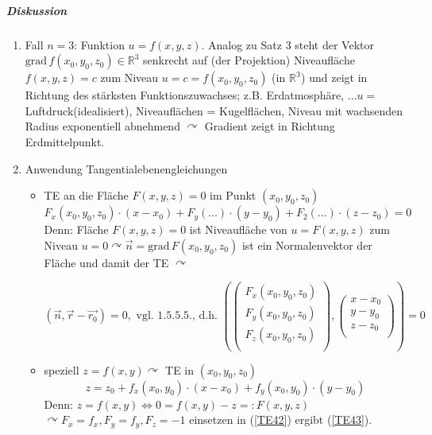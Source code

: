 \documentclass[a4paper]{scrartcl}
\begin{document}
\subparagraph{Diskussion}
\begin{enumerate}
\item Fall $n=3$: Funktion $u=f(x,y,z)$. Analog zu Satz 3 steht der Vektor $\text{grad} \, f (x_0,y_0,z_0) \in \mathbb{R}^3$ senkrecht auf (der Projektion) Niveaufläche $f(x,y,z) = c$ zum Niveau $u=c=f(x_0,y_0,z_0)$ (in $\mathbb{R^3}$) und zeigt in Richtung des stärksten Funktionszuwachses; z.B. Erdatmosphäre, $\dots u = $ Luftdruck(idealisiert), Niveauflächen = Kugelflächen, Niveau mit wachsenden Radius exponentiell abnehmend $\curvearrowright$ Gradient zeigt in Richtung Erdmittelpunkt.
\item Anwendung Tangentialebenengleichungen
\begin{itemize}
\item TE an die Fläche $F(x,y,z)= 0$ im Punkt $(x_0,y_0,z_0)$
\begin{equation}\label{TE42}
F_x (x_0,y_0,z_0) \cdot (x-x_0) + F_y (\dots) \cdot (y-y_0) + F_2 (\dots) \cdot (z-z_0) = 0
\end{equation}
Denn: Fläche $F(x,y,z) = 0$ ist Niveaufläche von $u=F(x,y,z)$ zum Niveau $u=0 \curvearrowright \vec{n} = \text{grad} \, F(x_0,y_0,z_0)$ ist ein Normalenvektor der Fläche und damit der TE $\curvearrowright$

\[(\vec{n},\vec{r}-\vec{r_0}) = 0, \text{ vgl. 1.5.5.5., d.h. } \left ( \begin{pmatrix} F_x(x_0,y_0,z_0) \\ F_y(x_0,y_0,z_0)\\ F_z(x_0,y_0,z_0)\\ \end{pmatrix}, \begin{pmatrix} x-x_0 \\ y-y_0\\ z-z_0 \\ \end{pmatrix} \right ) = 0\]
\item speziell $z=f(x,y) \curvearrowright $ TE in $(x_0,y_0,z_0)$
\begin{equation}\label{TE43}
z = z_0 + f_x(x_0,y_0) \cdot (x-x_0) + f_y(x_0,y_0) \cdot (y-y_0)
\end{equation}
Denn: $z=f(x,y) \Leftrightarrow 0 = f(x,y) - z =: F(x,y,z)$\\
$\curvearrowright F_x = f_x , F_y = f_y, F_z = -1$ einsetzen in (\ref{TE42}) ergibt (\ref{TE43}).
\end{itemize}
\end{enumerate}
\end{document}
